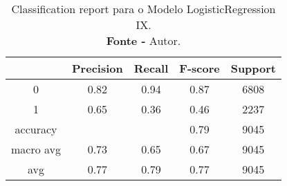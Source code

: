 % 
\begin{table}[H]
    \centering
    \begin{tabular}{@{}ccccc@{}}
    \toprule
     & \textbf{Precision} & \textbf{Recall} &\textbf{F-score} & \textbf{Support} \\ \midrule 
    0 & 0.82 & 0.94 & 0.87 & 6808 \\ 
    1 & 0.65 & 0.36 & 0.46 & 2237 \\ 
    accuracy &  &  & 0.79 & 9045 \\ 
    macro avg & 0.73 & 0.65 & 0.67 & 9045 \\ 
    avg & 0.77 & 0.79 & 0.77 & 9045 \\ \bottomrule 
    \end{tabular}
    \caption{Classification report para o Modelo LogisticRegression IX. \\  \textbf{Fonte -} Autor.}
    \label{tab: classification-report-Modelo LogisticRegression IX}
\end{table}